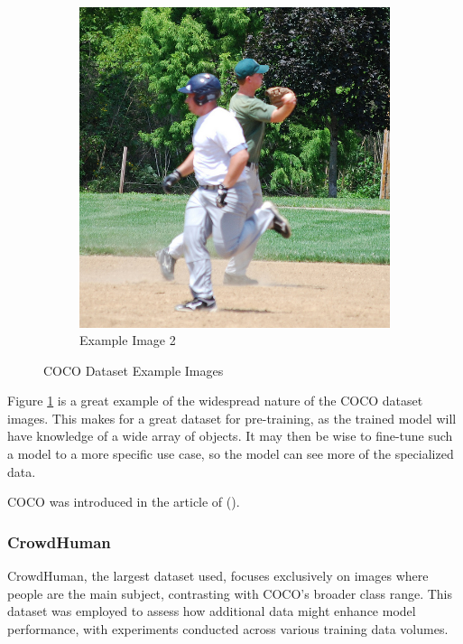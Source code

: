 \begin{figure}[H]
\begin{subfigure}{0.49\textwidth}
        \includegraphics[width=\textwidth]{Images/External_datasets/coco_2.jpg}
        \caption{\centering Example Image 2}
    \end{subfigure}
    \caption{\centering COCO Dataset Example Images}
    \label{fig:COCO_examples}
\end{figure}

Figure \ref{fig:COCO_examples} is a great example of the widespread nature of the COCO dataset images. This makes for a great dataset for pre-training, as the trained model will have knowledge of a wide array of objects. It may then be wise to fine-tune such a model to a more specific use case, so the model can see more of the specialized data. 

COCO was introduced in the article of \citeauthor{lin2015microsoft} (\citeyear{lin2015microsoft}).

\subsubsection{CrowdHuman}
\label{sec:dataset_CrowdHuman}
CrowdHuman, the largest dataset used, focuses exclusively on images where people are the main subject, contrasting with COCO's broader class range. This dataset was employed to assess how additional data might enhance model performance, with experiments conducted across various training data volumes.

